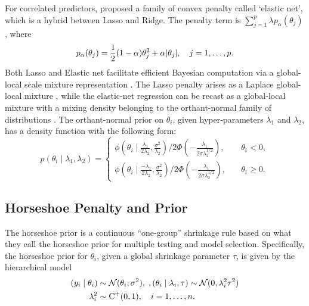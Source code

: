 \documentclass[11pt]{article}
\begin{document}
For correlated predictors, \cite{zou2005regularization} proposed a family of
convex penalty called `elastic net', which is a hybrid between Lasso and Ridge.
The penalty term is $\sum_{j=1}^{p} \lambda p_{\alpha}(\theta_j)$, where 
\[
p_{\alpha}(\theta_j) = \frac{1}{2} (1-\alpha)\theta_j^2 + \alpha \lvert\theta_j\rvert, \quad j = 1, \ldots, p. 
\]
Both Lasso and Elastic net facilitate efficient Bayesian computation via a
global-local scale mixture representation \citep{bhadra2016global}. The Lasso
penalty arises as a Laplace global-local mixture \citep{andrews1974scale},
while the elastic-net regression can be recast as a global-local mixture with a
mixing density belonging to the orthant-normal family of distributions
\citep{hans2011elastic}.  The orthant-normal prior on $\theta_i$, given
hyper-parameters $\lambda_1$ and $\lambda_2$, has a density function with the
following form:
\begin{equation}
  p(\theta_i \mid \lambda_1, \lambda_2)  = 
  \begin{cases} 
   \phi(\theta_i \mid \frac{\lambda_1}{2\lambda_2}, \frac{\sigma^2}{\lambda_2}) / 2\Phi\left(-\frac{\lambda_1}{2\sigma \lambda_2^{1/2} }\right), & \quad \theta_i < 0, \\
   \phi(\theta_i \mid \frac{-\lambda_1}{2\lambda_2}, \frac{\sigma^2}{\lambda_2}) / 2\Phi\left(-\frac{\lambda_1}{2\sigma \lambda_2^{1/2} }\right), & \quad \theta_i \geq 0. \end{cases} 
  \label{eq:hans}
\end{equation}
 

\subsection{Horseshoe Penalty and Prior}
\label{sec:one-gp}


The horseshoe prior is a continuous ``one-group'' shrinkage rule based on what
they call the horseshoe prior for multiple testing and model selection.
Specifically, the horseshoe prior for $\theta_i$, given a global shrinkage
parameter $\tau$, is given by the hierarchical model 
\begin{align}
  (y_i \mid \theta_i) & \sim {\cal N}(\theta_i , \sigma^2), \;, 
  (\theta_i \mid \lambda_i, \tau) \sim 
  {\cal N}(0, \lambda_i^2 \tau^2) \nonumber \\ \lambda_i ^2 &
  \sim \operatorname{C}^{+}(0,1), \quad i = 1, \ldots, n. 
  \label{eq:hs}
\end{align}
\end{document}
